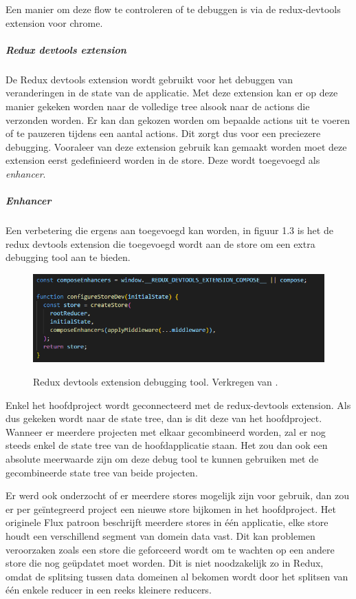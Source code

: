 Een manier om deze flow te controleren of te debuggen is via de redux-devtools extension voor chrome. 

\subparagraph{Redux devtools extension}
De Redux devtools extension wordt gebruikt voor het debuggen van veranderingen in de state van de applicatie. Met deze extension kan er op deze manier gekeken worden naar de volledige tree alsook naar de actions die verzonden worden. Er kan dan gekozen worden om bepaalde actions uit te voeren of te pauzeren tijdens een aantal actions. Dit zorgt dus voor een preciezere debugging. Vooraleer van deze extension gebruik kan gemaakt worden moet deze extension eerst gedefinieerd worden in de store. Deze wordt toegevoegd als \textit{enhancer}. 

\subparagraph{Enhancer}
Een verbetering die ergens aan toegevoegd kan worden, in figuur 1.3 is het de redux devtools extension die toegevoegd wordt aan de store om een extra debugging tool aan te bieden.
\begin{figure}
	\begin{center}
		\caption{Redux devtools extension debugging tool. Verkregen van \textcite{devtools}.}
		\includegraphics[width=14cm]{img/redux-devtools}\\[0.5cm]
	\end{center}
\end{figure}

Enkel het hoofdproject wordt geconnecteerd met de redux-devtools extension. Als dus gekeken wordt naar de state tree, dan is dit deze van het hoofdproject. Wanneer er meerdere projecten met elkaar gecombineerd worden, zal er nog steeds enkel de state tree van de hoofdapplicatie staan. Het zou dan ook een absolute meerwaarde zijn om deze debug tool te kunnen gebruiken met de gecombineerde state tree van beide projecten.
\autocite{devtools}

Er werd ook onderzocht of er meerdere stores mogelijk zijn voor gebruik, dan zou er per geïntegreerd project een nieuwe store bijkomen in het hoofdproject.
Het originele Flux patroon beschrijft meerdere stores in één applicatie, elke store houdt een verschillend segment van domein data vast. Dit kan problemen veroorzaken zoals een store die geforceerd wordt om te wachten op een andere store die nog geüpdatet moet worden. Dit is niet noodzakelijk zo in Redux, omdat de splitsing tussen data domeinen al bekomen wordt door het splitsen van één enkele reducer in een reeks kleinere reducers.

